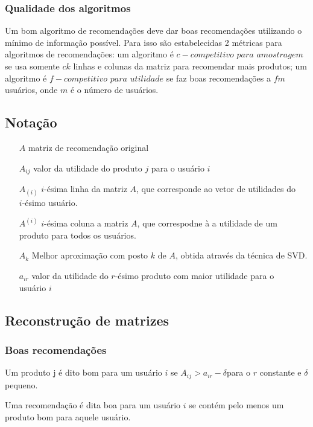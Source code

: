 \documentclass[a4paper,10pt]{article}
\begin{document}
\subsubsection{Qualidade dos algoritmos}

Um bom algoritmo de recomendações deve dar boas recomendações utilizando o mínimo de 
informação possível. Para isso são estabelecidas 2 métricas para algoritmos de 
recomendações: um algoritmo é $c-competitivo$ $para$ $amostragem$ se usa somente $ck$
linhas e colunas da matriz para recomendar mais produtos; um algoritmo é $f-competitivo$ $para$ $utilidade$
se faz boas recomendações a $fm$ usuários, onde $m$ é o número de usuários. 

\subsection{Notação}

\begin{itemize}
\item[$A$] matriz de recomendação original
\item[$A_{ij}$] valor da utilidade do produto $j$ para o usuário $i$
\item[$A_{(i)}$] $i$-ésima linha da matriz $A$, que corresponde ao
vetor de utilidades do \\ $i$-ésimo usuário.
\item[$A^{(i)}$] $i$-ésima coluna a matriz $A$, que correspodne à 
a utilidade de um produto para todos os usuários.
\item[$A_k$] Melhor aproximação com posto $k$ de $A$, obtida através da técnica de SVD.
\item[$a_{ir}$] valor da utilidade do $r$-ésimo produto com maior utilidade
para o \\ usuário $i$ 
\end{itemize}

\subsection{Reconstrução de matrizes}

\subsubsection{Boas recomendações}
\begin{definicao} \label{definicao:box} Um produto j é dito bom para um
usuário $i$ se $A_{ij} > a_{ir} - \delta$para o $r$ constante e $\delta$ pequeno.
\end{definicao}
\begin{definicao} \label{definicao:box}Uma recomendação é dita boa para um usuário
$i$ se contém pelo menos um produto bom para aquele usuário.
\end{definicao}
\end{document}

